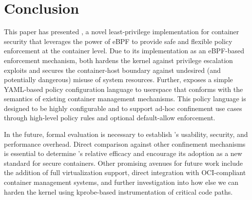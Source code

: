 \section{Conclusion}
\label{sec:conclusion}

This paper has presented \bpfcontain{}, a novel least-privilege implementation for container security that leverages the power of eBPF to provide safe and flexible policy enforcement at the container level. Due to its implementation as an eBPF-based enforcement mechanism, \bpfcontain{} both hardens the kernel against privilege escalation exploits and secures the container-host boundary against undesired (and potentially dangerous) misuse of system resources. Further, \bpfcontain{} exposes a simple YAML-based policy configuration language to userspace that conforms with the semantics of existing container management mechanisms. This policy language is designed to be highly configurable and to support ad-hoc confinement use cases through high-level policy rules and optional default-allow enforcement.

In the future, formal evaluation is necessary to establish \bpfcontain{}'s usability, security, and performance overhead. Direct comparison against other confinement mechanisms is essential to determine \bpfcontain{}'s relative efficacy and encourage its adoption as a new standard for secure containers. Other promising avenues for future work include the addition of full virtualization support, direct integration with OCI-compliant container management systems, and further investigation into how else we can harden the kernel using kprobe-based instrumentation of critical code paths.
